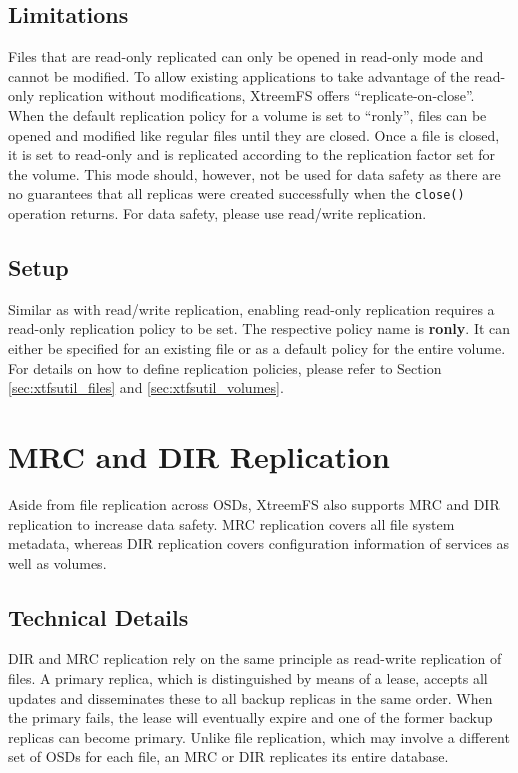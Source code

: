 \documentclass[a4paper,10pt]{book}
\begin{document}
\subsection{Limitations}
Files that are read-only replicated can only be opened in read-only mode and cannot be modified. To allow existing applications to take advantage of the read-only replication without modifications, XtreemFS offers ``replicate-on-close''. When the default replication policy for a volume is set to ``ronly'', files can be opened and modified like regular files until they are closed. Once a file is closed, it is set to read-only and is replicated according to the replication factor set for the volume. This mode should, however, not be used for data safety as there are no guarantees that all replicas were created successfully when the \texttt{close()} operation returns. For data safety, please use read/write replication.

\subsection{Setup}
Similar as with read/write replication, enabling read-only replication requires a read-only replication policy to be set. The respective policy name is \textbf{ronly}. It can either be specified for an existing file or as a default policy for the entire volume. For details on how to define replication policies, please refer to Section \ref{sec:xtfsutil_files} and \ref{sec:xtfsutil_volumes}.


\section{MRC and DIR Replication}
Aside from file replication across OSDs, XtreemFS also supports MRC and DIR replication to increase data safety. MRC replication covers all file system metadata, whereas DIR replication covers configuration information of services as well as volumes.

\subsection{Technical Details}
DIR and MRC replication rely on the same principle as read-write replication of files. A primary replica, which is distinguished by means of a lease, accepts all updates and disseminates these to all backup replicas in the same order. When the primary fails, the lease will eventually expire and one of the former backup replicas can become primary. Unlike file replication, which may involve a different set of OSDs for each file, an MRC or DIR replicates its entire database.
\end{document}
